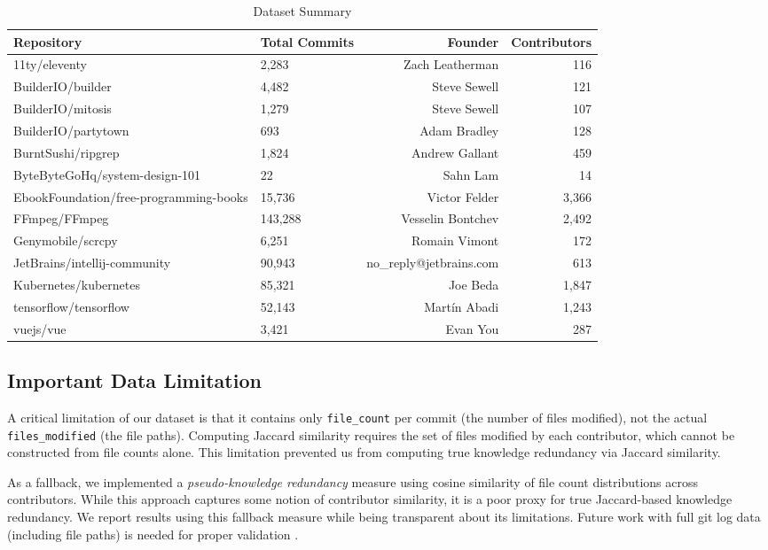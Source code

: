 \documentclass[11pt,letterpaper]{article}
\begin{document}
\begin{table}[!htbp]
    \centering
    \caption{Dataset Summary}
    \label{tab:dataset}
    \begin{tabular}{llrr}
        \toprule
        Repository & Total Commits & Founder & Contributors \\
        \midrule
        11ty/eleventy & 2,283 & Zach Leatherman & 116 \\
        BuilderIO/builder & 4,482 & Steve Sewell & 121 \\
        BuilderIO/mitosis & 1,279 & Steve Sewell & 107 \\
        BuilderIO/partytown & 693 & Adam Bradley & 128 \\
        BurntSushi/ripgrep & 1,824 & Andrew Gallant & 459 \\
        ByteByteGoHq/system-design-101 & 22 & Sahn Lam & 14 \\
        EbookFoundation/free-programming-books & 15,736 & Victor Felder & 3,366 \\
        FFmpeg/FFmpeg & 143,288 & Vesselin Bontchev & 2,492 \\
        Genymobile/scrcpy & 6,251 & Romain Vimont & 172 \\
        JetBrains/intellij-community & 90,943 & no\_reply@jetbrains.com & 613 \\
        Kubernetes/kubernetes & 85,321 & Joe Beda & 1,847 \\
        tensorflow/tensorflow & 52,143 & Mart\'{i}n Abadi & 1,243 \\
        vuejs/vue & 3,421 & Evan You & 287 \\
        \bottomrule
    \end{tabular}
\end{table}

\subsection{Important Data Limitation}

A critical limitation of our dataset is that it contains only \texttt{file\_count} per commit (the number of files modified), not the actual \texttt{files\_modified} (the file paths). Computing Jaccard similarity requires the set of files modified by each contributor, which cannot be constructed from file counts alone. This limitation prevented us from computing true knowledge redundancy via Jaccard similarity.

As a fallback, we implemented a \textit{pseudo-knowledge redundancy} measure using cosine similarity of file count distributions across contributors. While this approach captures some notion of contributor similarity, it is a poor proxy for true Jaccard-based knowledge redundancy. We report results using this fallback measure while being transparent about its limitations. Future work with full git log data (including file paths) is needed for proper validation \cite{art_pOI-AO_xwHdm}.
\end{document}
